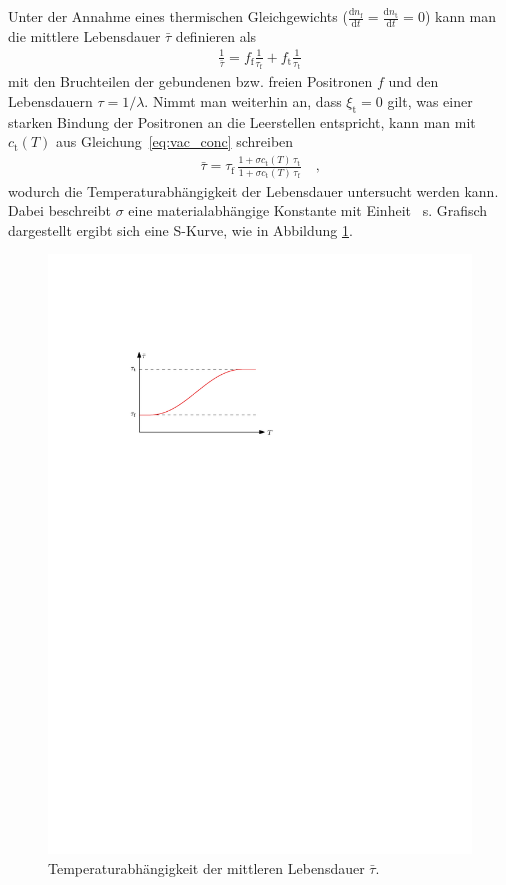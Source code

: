 \documentclass[11pt, a4paper]{article}
\numberwithin{equation}{section}
\begin{document}
Unter der Annahme eines thermischen Gleichgewichts ($\frac{\mathrm{d}n_\mathrm{f}}{\mathrm{d}t} = \frac{\mathrm{d}n_\mathrm{t}}{\mathrm{d}t} = 0$) kann man die mittlere Lebensdauer $\bar\tau$ definieren als
\begin{align*}
	\frac{1}{\bar\tau}=f_\mathrm{f}\frac{1}{\tau_\mathrm{f}} + f_\mathrm{t}\frac{1}{\tau_\mathrm{t}}
\end{align*}
mit den Bruchteilen der gebundenen bzw. freien Positronen $f$ und den Lebensdauern $\tau = 1/\lambda$.
Nimmt man weiterhin an, dass $\xi_\mathrm{t}=0$ gilt, was einer starken Bindung der Positronen an die Leerstellen entspricht, kann man mit $c_\mathrm{t}(T)$ aus Gleichung~\eqref{eq:vac_conc} schreiben \cite{add_infos}
\begin{align}
	\bar\tau=\tau_\mathrm{f} \, \frac{1+\sigma c_\mathrm{t}(T) \, \tau_\mathrm{t}}{1+\sigma c_\mathrm{t}(T) \, \tau_\mathrm{f}}\quad\text{,}
	\label{eq:mean_lifetime}
\end{align}
wodurch die Temperaturabhängigkeit der Lebensdauer untersucht werden kann.
Dabei beschreibt $\sigma$ eine materialabhängige Konstante mit Einheit \si{\per\second}.
Grafisch dargestellt ergibt sich eine S-Kurve, wie in Abbildung \ref{fig:s_curve_schematic}.
\begin{figure}[htbp]
	\centering
	\includegraphics[width=.6\textwidth]{./figures/s_curve_schematic}
	\caption{Temperaturabhängigkeit der mittleren Lebensdauer $\bar\tau$.}
	\label{fig:s_curve_schematic}
\end{figure}
\end{document}
